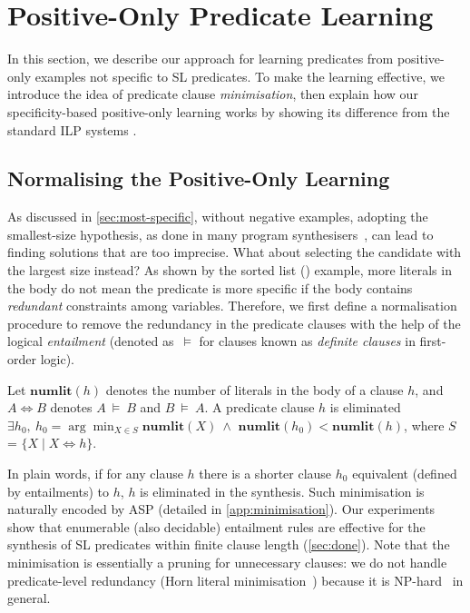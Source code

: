 \section{Positive-Only Predicate Learning}
\label{sec:positive}

In this section, we describe our approach for learning predicates from
positive-only examples not specific to SL predicates. To make the learning effective, we introduce the idea of predicate clause \emph{minimisation}, then explain how our specificity-based positive-only
learning works by showing its difference from the standard ILP systems \cite{cropper2021learning,cropper2022learning2}.






\vspace{-5pt}
\subsection{Normalising the Positive-Only Learning}
\label{sec:normalise}


As discussed in \autoref{sec:most-specific}, without negative
examples, adopting the smallest-size hypothesis, as done in many
program synthesisers~\cite{ji2021generalizable,lee2021combining}, can
lead to finding solutions that are too imprecise.
%
What about selecting the candidate with the largest size instead?
%
As shown by the {sorted list} () example, more
literals in the body do not mean the predicate is more specific if the
body contains \emph{redundant} constraints among variables. Therefore, we first define a normalisation procedure to remove the redundancy in the predicate clauses with the help of the logical
\emph{entailment} (denoted as~$\models$ for \prolog clauses known as
\emph{definite clauses} in first-order logic).
%

\begin{definition}
  Let $\mathbf{numlit}(h)$ denotes the number of literals in the body
  of a clause $h$, and $ A \iff B$ denotes $A~\models~B$ and
  $B~\models~A$. A predicate clause $h$ is eliminated \Iff
  $\exists h_0,~h_0 = \arg\min_{X \in S} \mathbf{numlit}(X)~\land$
  $\mathbf{numlit}(h_0) < \mathbf{numlit}(h)$, where $S$ =
  $\{X \mid X \iff h\}$.
  
\end{definition}

In plain words, if for any clause $h$ there is a shorter clause $h_0$ equivalent (defined by entailments) to $h$, $h$ is
eliminated in the synthesis. Such minimisation is naturally encoded by ASP (detailed in \autoref{app:minimisation}).
Our experiments show that enumerable (also decidable) entailment rules
are effective for the synthesis of SL predicates within finite clause
length (\cf \autoref{sec:done}). Note that the minimisation is essentially a pruning for unnecessary clauses: we do not handle predicate-level redundancy (\aka Horn literal
minimisation~\cite{cepek1997stuctural}) because it is NP-hard~\cite{DBLP:journals/ai/HammerK93} in general. 



